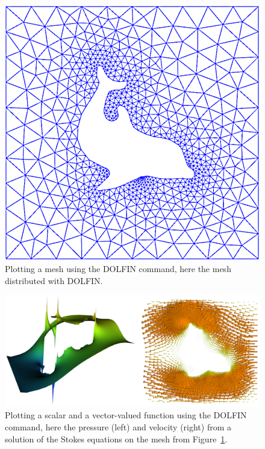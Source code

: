 \begin{figure}
  \center\includegraphics[width=\smallfig]{chapters/logg-2/png/plot_mesh.png}
  \caption{Plotting a mesh using the DOLFIN  command, here
    the mesh  distributed with DOLFIN.}
    \label{fig:logg-2:plots,mesh}
\end{figure}

\begin{figure}
  \center\includegraphics[width=\largefig]{chapters/logg-2/png/plots.png}
    \caption{Plotting a scalar and a vector-valued function using the
      DOLFIN  command, here the pressure (left) and velocity
      (right) from a solution of the Stokes equations on the mesh from
    Figure~\ref{fig:logg-2:plots,mesh}.}
    \label{fig:logg-2:plots,function}
\end{figure}

